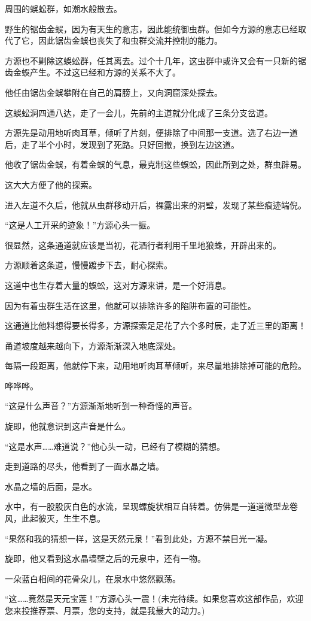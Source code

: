 \begin{this_body}
周围的蜈蚣群，如潮水般散去。

野生的锯齿金蜈，因为有天生的意志，因此能统御虫群。但如今方源的意志已经取代了它，因此锯齿金蜈也丧失了和虫群交流并控制的能力。

方源也不剿除这蜈蚣群，任其离去。过个十几年，这虫群中或许又会有一只新的锯齿金蜈产生。不过这已经和方源的关系不大了。

他任由锯齿金蜈攀附在自己的肩膀上，又向洞窟深处探去。

这蜈蚣洞四通八达，走了一会儿，先前的主道就分化成了三条分支岔道。

方源先是动用地听肉耳草，倾听了片刻，便排除了中间那一支道。选了右边一道后，走了半个小时，发现到了死路。只好回撤，换到左边这道。

他收了锯齿金蜈，有着金蜈的气息，最克制这些蜈蚣，因此所到之处，群虫辟易。

这大大方便了他的探索。

进入左道不久后，他就从虫群移动开后，裸露出来的洞壁，发现了某些痕迹端倪。

“这是人工开采的迹象！”方源心头一振。

很显然，这条通道就应该是当初，花酒行者利用千里地狼蛛，开辟出来的。

方源顺着这条道，慢慢踱步下去，耐心探索。

这道中也生存着大量的蜈蚣，这对方源来讲，是一个好消息。

因为有着虫群生活在这里，他就可以排除许多的陷阱布置的可能性。

这通道比他料想得要长得多，方源探索足足花了六个多时辰，走了近三里的距离！

甬道坡度越来越向下，方源渐渐深入地底深处。

每隔一段距离，他就停下来，动用地听肉耳草倾听，来尽量地排除掉可能的危险。

哗哗哗。

“这是什么声音？”方源渐渐地听到一种奇怪的声音。

旋即，他就意识到这声音是什么。

“这是水声……难道说？”他心头一动，已经有了模糊的猜想。

走到道路的尽头，他看到了一面水晶之墙。

水晶之墙的后面，是水。

水中，有一股股灰白色的水流，呈现螺旋状相互自转着。仿佛是一道道微型龙卷风，此起彼灭，生生不息。

“果然和我的猜想一样，这是天然元泉！”看到此处，方源不禁目光一凝。

旋即，他又看到这水晶墙壁之后的元泉中，还有一物。

一朵蓝白相间的花骨朵儿，在泉水中悠然飘荡。

“这……竟然是天元宝莲！”方源心头一震！(未完待续。如果您喜欢这部作品，欢迎您来投推荐票、月票，您的支持，就是我最大的动力。)

\end{this_body}

